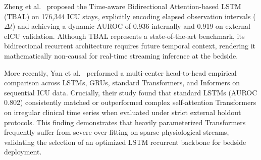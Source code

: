 \documentclass[conference]{IEEEtran}
\begin{document}
Zheng et al.~\cite{zheng2025} proposed the Time-aware Bidirectional Attention-based LSTM (TBAL) on 176,344 ICU stays, explicitly encoding elapsed observation intervals ($\Delta t$) and achieving a dynamic AUROC of 0.936 internally and 0.919 on external eICU validation. Although TBAL represents a state-of-the-art benchmark, its bidirectional recurrent architecture requires future temporal context, rendering it mathematically non-causal for real-time streaming inference at the bedside.

More recently, Yan et al.~\cite{yan2026} performed a multi-center head-to-head empirical comparison across LSTMs, GRUs, standard Transformers, and Informers on sequential ICU data. Crucially, their study found that standard LSTMs (AUROC 0.802) consistently matched or outperformed complex self-attention Transformers on irregular clinical time series when evaluated under strict external holdout protocols. This finding demonstrates that heavily parameterized Transformers frequently suffer from severe over-fitting on sparse physiological streams, validating the selection of an optimized LSTM recurrent backbone for bedside deployment.
\end{document}
